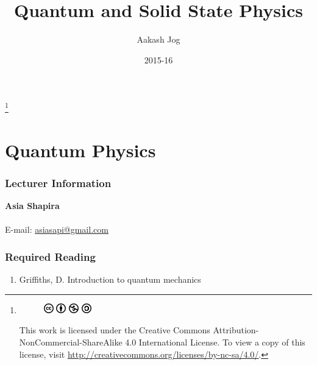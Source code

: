 \documentclass[titlepage, fleqn, a4paper, 12pt, twoside]{article}
\title{Quantum and Solid State Physics}
\author{Aakash Jog}
\date{2015-16}
\theoremstyle{definition}
\theoremstyle{theorem}
\let\Oldpart\part
\renewcommand{\part}{\FloatBarrier\Oldpart}
\let\Oldsection\section
\renewcommand{\section}{\FloatBarrier\Oldsection}
\newcommand\blfootnote[1]{%
	\begingroup
	\renewcommand\thefootnote{}\footnote{#1}%
	\addtocounter{footnote}{-1}%
	\endgroup
}
\begin{document}
\maketitle

\blfootnote
{	
	\begin{figure}[H]
		\includegraphics[height = 12pt]{cc.pdf}
		\includegraphics[height = 12pt]{by.pdf}
		\includegraphics[height = 12pt]{nc.pdf}
		\includegraphics[height = 12pt]{sa.pdf}
	\end{figure}
	This work is licensed under the Creative Commons Attribution-NonCommercial-ShareAlike 4.0 International License. To view a copy of this license, visit \url{http://creativecommons.org/licenses/by-nc-sa/4.0/}.
} %

\tableofcontents

\newpage
\listoffigures

\newpage
{}
\part{Quantum Physics}

\section{Lecturer Information}

\textbf{Asia Shapira}\\
~\\
E-mail: \href{mailto:asiasapi@gmail.com}{asiasapi@gmail.com}\\

\section{Required Reading}

\begin{enumerate}
	\item Griffiths, D. Introduction to quantum mechanics
\end{enumerate}
\end{document}
